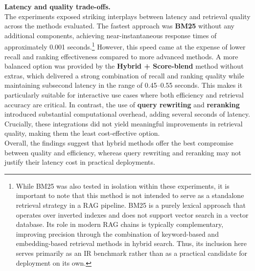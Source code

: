 \begin{spacing}{1.5}
\noindent \textbf{Latency and quality trade-offs.}\\
The experiments exposed striking interplays between latency and retrieval quality across the methods evaluated. The fastest approach was \textbf{BM25} without any additional components, achieving near-instantaneous response times of approximately 0.001 seconds.\footnote{While BM25 was also tested in isolation within these experiments, it is important to note that this method is not intended to serve as a standalone retrieval strategy in a RAG pipeline. BM25 is a purely lexical approach that operates over inverted indexes and does not support vector search in a vector database. Its role in modern RAG chains is typically complementary, improving precision through the combination of keyword-based and embedding-based retrieval methods in hybrid search. Thus, its inclusion here serves primarily as an IR benchmark rather than as a practical candidate for deployment on its own.} However, this speed came at the expense of lower recall and ranking effectiveness compared to more advanced methods. A more balanced option was provided by the \textbf{Hybrid + Score-blend} method without extras, which delivered a strong combination of recall and ranking quality while maintaining subsecond latency in the range of 0.45--0.55 seconds. This makes it particularly suitable for interactive use cases where both efficiency and retrieval accuracy are critical. In contrast, the use of \textbf{query rewriting} and \textbf{reranking} introduced substantial computational overhead, adding several seconds of latency. Crucially, these integrations did not yield meaningful improvements in retrieval quality, making them the least cost-effective option.\\

\noindent Overall, the findings suggest that hybrid methods offer the best compromise between quality and efficiency, whereas query rewriting and reranking may not justify their latency cost in practical deployments.



\end{spacing}
